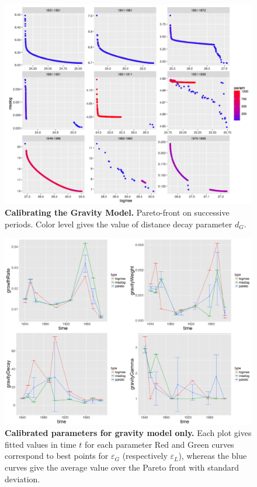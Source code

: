 \documentclass[Royal,sageh,times]{sagej}
\begin{document}
\begin{figure}
\centering
\includegraphics[width=\textwidth]{figures/Fig4}
\caption{\textbf{Calibrating the Gravity Model.} Pareto-front on successive periods.  Color level gives the value of distance decay parameter $d_G$.}
\label{fig:gravity-pareto}
\end{figure}


\begin{figure}
\centering
\includegraphics[width=\textwidth]{figures/Fig5}
\caption{\textbf{Calibrated parameters for gravity model only.} Each plot gives fitted values in time $t$ for each parameter Red and Green curves correspond to best points for $\varepsilon_G$ (respectively $\varepsilon_L$), whereas the blue curves give the average value over the Pareto front with standard deviation.}
\label{fig:gravity-params}
\end{figure}
\end{document}
